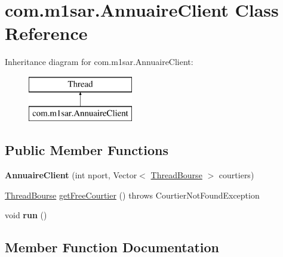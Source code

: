 \hypertarget{classcom_1_1m1sar_1_1_annuaire_client}{}\section{com.\+m1sar.\+Annuaire\+Client Class Reference}
\label{classcom_1_1m1sar_1_1_annuaire_client}
Inheritance diagram for com.\+m1sar.\+Annuaire\+Client\+:\begin{figure}[H]
\begin{center}
\leavevmode
\includegraphics[height=2.000000cm]{classcom_1_1m1sar_1_1_annuaire_client}
\end{center}
\end{figure}
\subsection*{Public Member Functions}
\begin{DoxyCompactItemize}
\item 
\mbox{\label{classcom_1_1m1sar_1_1_annuaire_client_a26d79864935f527b115ccecf5e966268}} 
{\bfseries Annuaire\+Client} (int nport, Vector$<$ \hyperlink{classcom_1_1m1sar_1_1_thread_bourse}{Thread\+Bourse} $>$ courtiers)
\item 
\hyperlink{classcom_1_1m1sar_1_1_thread_bourse}{Thread\+Bourse} \hyperlink{classcom_1_1m1sar_1_1_annuaire_client_ac597ddd8b46c5fe7954f8d52039aa61b}{get\+Free\+Courtier} ()  throws Courtier\+Not\+Found\+Exception 
\item 
\mbox{\label{classcom_1_1m1sar_1_1_annuaire_client_a9fb3d7b87893f2fa99b03b78dbcd964f}} 
void {\bfseries run} ()
\end{DoxyCompactItemize}


\subsection{Member Function Documentation}
\mbox{\label{classcom_1_1m1sar_1_1_annuaire_client_ac597ddd8b46c5fe7954f8d52039aa61b}} 
